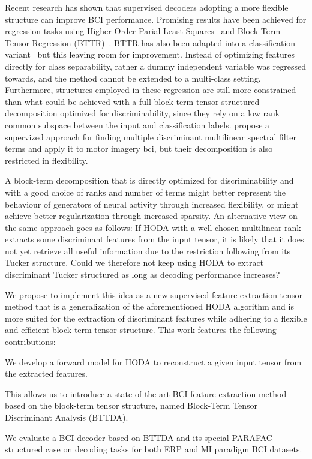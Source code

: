 Recent research has shown that supervised decoders adopting a more flexible structure
can improve BCI performance.
Promising results have been achieved for regression tasks using
Higher Order Parial Least Squares~\cite{Camarrone2018} and Block-Term Tensor
Regression (BTTR)~\cite{Faes2022,Faes2022b}.
BTTR has also been adapted into a classification variant~\cite{Camarrone2021}
but this leaving room for improvement.
Instead of optimizing features directly for class separability, rather a dummy
independent variable was regressed towards, and the method
cannot be extended to a multi-class setting.
Furthermore, structures employed in these regression are still more constrained
than what could be achieved with a full block-term tensor structured decomposition
optimized for discriminability, since they rely on a low rank common subspace
between the input and classification labels.
\textcite{Huang2020} propose a supervized approach for finding multiple discriminant
multilinear spectral filter terms and apply it to motor imagery \ac{bci}, but their
decomposition is also restricted in flexibility.




A block-term decomposition that is directly optimized for discriminability and with a
good choice of ranks and number of terms might better represent the behaviour
of generators of neural activity through increased flexibility, or might
achieve better regularization through increased sparsity.
An alternative view on the same approach goes as follows:
If HODA with a well chosen multilinear rank extracts some discriminant features
from the input tensor, it is likely that it does not yet retrieve all useful
information due to the restriction following from its Tucker structure.
Could we therefore not keep using HODA to extract discriminant Tucker structured
as long as decoding performance increases?

We propose to implement this idea as a new supervised feature
extraction tensor method that is a generalization of the aforementioned HODA
algorithm and is more suited for the extraction of discriminant
features while adhering to a flexible and efficient block-term tensor
structure.
This work features the following contributions:
\begin{enumerate*}[label={\arabic*)}]
	\item  We develop a forward model for HODA to reconstruct a
	      given input tensor from the extracted features.
	\item This allows us to introduce a state-of-the-art BCI feature extraction
        method based on the block-term tensor structure, named Block-Term Tensor Discriminant Analysis
	      (BTTDA).
  \item We evaluate a BCI decoder based on BTTDA and its special
	      PARAFAC-structured case on decoding tasks for both ERP and MI
	      paradigm BCI datasets.
\end{enumerate*}
